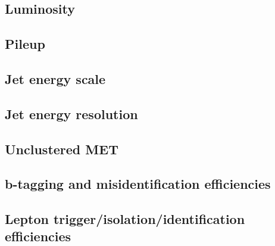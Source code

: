 \subsection{Luminosity}
\label{sec:syslumi}

\subsection{Pileup}
\label{sec:syspileup}

\subsection{Jet energy scale}
\label{sec:sysjes}

\subsection{Jet energy resolution}
\label{sec:sysjer}

\subsection{Unclustered MET}
\label{sec:sysmet}

\subsection{b-tagging and misidentification efficiencies}
\label{sec:sysbtag}

\subsection{Lepton trigger/isolation/identification efficiencies}
\label{sec:systrigg}



\clearpage{\pagestyle{empty}\cleardoublepage}

